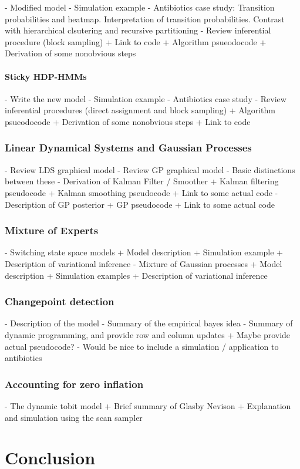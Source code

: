 \documentclass{report}
\begin{document}
- Modified model
- Simulation example
- Antibiotics case study: Transition probabilities and heatmap. Interpretation
of transition probabilities. Contrast with hierarchical clsutering and recursive
partitioning
- Review inferential procedure (block sampling)
  + Link to code
  + Algorithm psueodocode
  + Derivation of some nonobvious steps

\subsubsection{Sticky HDP-HMMs}

- Write the new model
- Simulation example
- Antibiotics case study
- Review inferential procedures (direct assignment and block sampling)
  + Algorithm psueodocode
  + Derivation of some nonobvious steps
  + Link to code

\subsection{Linear Dynamical Systems and Gaussian Processes}

- Review LDS graphical model
- Review GP graphical model
- Basic distinctions between these
- Derivation of Kalman Filter / Smoother
  + Kalman filtering pseudocode
  + Kalman smoothing pseudocode
  + Link to some actual code
- Description of GP posterior
  + GP pseudocode
  + Link to some actual code

\subsection{Mixture of Experts}

- Switching state space models
   + Model description
   + Simulation example
   + Description of variational inference
- Mixture of Gaussian processes
  + Model description
  + Simulation examples
  + Description of variational inference

\subsection{Changepoint detection}

- Description of the model
- Summary of the empirical bayes idea
- Summary of dynamic programming, and provide row and column updates
  + Maybe provide actual pseudocode?
- Would be nice to include a simulation / application to antibiotics

\subsection{Accounting for zero inflation}

- The dynamic tobit model
  + Brief summary of Glasby Nevison
  + Explanation and simulation using the scan sampler

\chapter{Conclusion}



\end{document}
